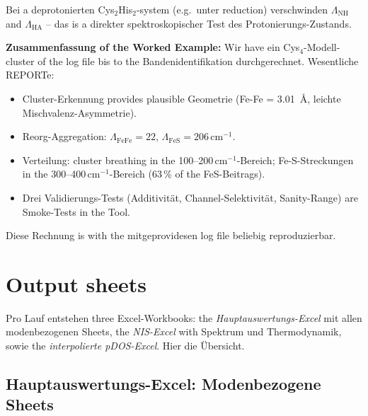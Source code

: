 \documentclass[11pt,a4paper,twoside]{article}
\providecommand{\angstrom}{\text{\AA}}    %
\theoremstyle{remark}
\begin{document}
Bei a deprotonierten Cys$_2$His$_2$-system (e.g.\ unter
reduction) verschwinden $\Lambda_\text{NH}$ and $\Lambda_\text{HA}$ --
das is a direkter spektroskopischer Test des
Protonierungs-Zustands.

\begin{infobox}
\textbf{Zusammenfassung of the Worked Example:} Wir have ein
Cys$_4$-Modell-cluster of the log file bis to the Bandenidentifikation
durchgerechnet. Wesentliche REPORTe:
\begin{itemize}\setlength{\itemsep}{0pt}
  \item Cluster-Erkennung provides plausible Geometrie (Fe-Fe = 3.01\,
        $\angstrom$, leichte Mischvalenz-Asymmetrie).
  \item Reorg-Aggregation: $\Lambda_\text{FeFe} = 22$, $\Lambda_\text{FeS}
        = 206$\,cm$^{-1}$.
  \item Verteilung: cluster breathing in the 100--200\,cm$^{-1}$-Bereich;
        Fe-S-Streckungen in the 300--400\,cm$^{-1}$-Bereich (63\,\%
        of the FeS-Beitrags).
  \item Drei Validierungs-Tests (Additivit\"at, Channel-Selektivit\"at,
        Sanity-Range) are Smoke-Tests in the Tool.
\end{itemize}
Diese Rechnung is with the mitgeprovidesen log file beliebig
reproduzierbar.
\end{infobox}


\section{Output sheets}
\label{sec:ausgabe}

Pro Lauf entstehen three Excel-Workbooks: the \emph{Hauptauswertungs-Excel}
mit allen modenbezogenen Sheets, the \emph{NIS-Excel} with Spektrum und
Thermodynamik, sowie the \emph{interpolierte pDOS-Excel}. Hier die
\"Ubersicht.

\subsection{Hauptauswertungs-Excel: Modenbezogene Sheets}
\end{document}
